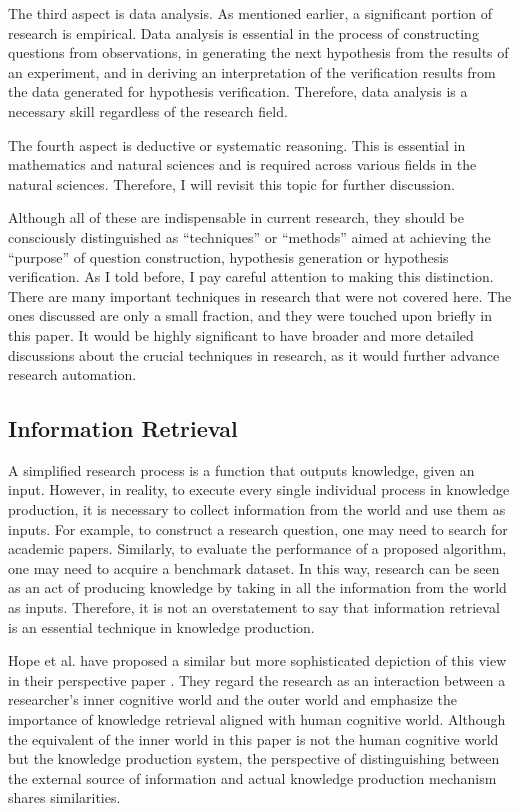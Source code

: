 \documentclass{book}
\begin{document}
The third aspect is data analysis. As mentioned earlier, a significant portion of research is empirical. Data analysis is essential in the process of constructing questions from observations, in generating the next hypothesis from the results of an experiment, and in deriving an interpretation of the verification results from the data generated for hypothesis verification. Therefore, data analysis is a necessary skill regardless of the research field. 

The fourth aspect is deductive or systematic reasoning. This is essential in mathematics and natural sciences and is required across various fields in the natural sciences. Therefore, I will revisit this topic for further discussion. 

Although all of these are indispensable in current research, they should be consciously distinguished as ``techniques'' or ``methods'' aimed at achieving the ``purpose'' of question construction, hypothesis generation or hypothesis verification. As I told before, I pay careful attention to making this distinction. There are many important techniques in research that were not covered here. The ones discussed are only a small fraction, and they were touched upon briefly in this paper. It would be highly significant to have broader and more detailed discussions about the crucial techniques in research, as it would further advance research automation.

\subsection{Information Retrieval}
A simplified research process is a function that outputs knowledge, given an input. However, in reality, to execute every single individual process in knowledge production, it is necessary to collect information from the world and use them as inputs. For example, to construct a research question, one may need to search for academic papers. Similarly, to evaluate the performance of a proposed algorithm, one may need to acquire a benchmark dataset. In this way, research can be seen as an act of producing knowledge by taking in all the information from the world as inputs. Therefore, it is not an overstatement to say that information retrieval is an essential technique in knowledge production. 

Hope et al. have proposed a similar but more sophisticated depiction of this view in their perspective paper \cite{hope2022computational}. They regard the research as an interaction between a researcher’s inner cognitive world and the outer world and emphasize the importance of knowledge retrieval aligned with human cognitive world. Although the equivalent of the inner world in this paper is not the human cognitive world but the knowledge production system, the perspective of distinguishing between the external source of information and actual knowledge production mechanism shares similarities.
\end{document}
